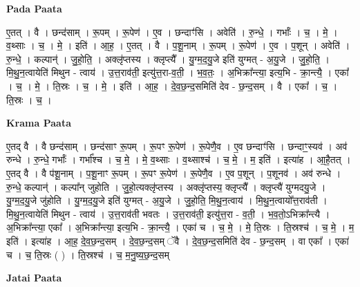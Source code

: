 \documentclass[17pt]{extarticle}
\begin{document}
\textbf{Pada Paata} \newline

ए॒तत् । वै । छन्द॑साम् । रू॒पम् । रू॒पेण॑ । ए॒व । छन्दाꣳ॑सि । अवेति॑ । रु॒न्धे॒ । गर्भाः᳚ । च॒ । मे॒ । व॒थ्साः । च॒ । मे॒ । इति॑ । आ॒ह॒ । ए॒तत् । वै । प॒शू॒नाम् । रू॒पम् । रू॒पेण॑ । ए॒व । प॒शून् । अवेति॑ । रु॒न्धे॒ । कल्पान्॑ । जु॒हो॒ति॒ । अक्लृ॑प्तस्य । क्लृप्त्यै᳚ । यु॒ग्म॒द॒यु॒जे इति॑ युग्मत् - अ॒यु॒जे । जु॒हो॒ति॒ । मि॒थु॒न॒त्वायेति॑ मिथुन - त्वाय॑ । उ॒त्त॒राव॑ती॒ इत्यु॑त्त॒रा-व॒ती॒ । भ॒व॒तः॒ । अ॒भिक्रा᳚न्त्या॒ इत्य॒भि - क्रा॒न्त्यै॒ । एका᳚ । च॒ । मे॒ । ति॒स्रः । च॒ । मे॒ । इति॑ । आ॒ह॒ । दे॒व॒छ॒न्द॒समिति॑ देव - छ॒न्द॒सम् । वै । एका᳚ । च॒ । ति॒स्रः । च॒ ।  \newline


\textbf{Krama Paata} \newline

ए॒तद् वै । वै छन्द॑साम् । छन्द॑साꣳ रू॒पम् । रू॒पꣳ रू॒पेण॑ । रू॒पेणै॒व । ए॒व छन्दाꣳ॑सि । छन्दाꣳ॒॒स्यव॑ । अव॑ रुन्धे । रु॒न्धे॒ गर्भाः᳚ । गर्भा᳚श्च । च॒ मे॒ । मे॒ व॒थ्साः । व॒थ्साश्च॑ । च॒ मे॒ । म॒ इति॑ । इत्या॑ह । आ॒है॒तत् । ए॒तद् वै । वै प॑शू॒नाम् । प॒शू॒नाꣳ रू॒पम् । रू॒पꣳ रू॒पेण॑ । रू॒पेणै॒व । ए॒व प॒शून् । प॒शूनव॑ । अव॑ रुन्धे । रु॒न्धे॒ कल्पान्॑ । कल्पा᳚न् जुहोति । जु॒हो॒त्यक्लृ॑प्तस्य । अक्लृ॑प्तस्य॒ क्लृप्त्यै᳚ । क्लृप्त्यै॑ युग्मदयु॒जे । यु॒ग्म॒द॒यु॒जे जु॑होति । यु॒ग्म॒द॒यु॒जे इति॑ युग्मत् - अ॒यु॒जे । जु॒हो॒ति॒ मि॒थु॒न॒त्वाय॑ । मि॒थु॒न॒त्वायो᳚त्त॒राव॑ती । मि॒थु॒न॒त्वायेति॑ मिथुन - त्वाय॑ । उ॒त्त॒राव॑ती भवतः । उ॒त्त॒राव॑ती॒ इत्यु॑त्त॒रा - व॒ती॒ । भ॒व॒तो॒ऽभिक्रा᳚न्त्यै । अ॒भिक्रा᳚न्त्या॒ एका᳚ । अ॒भिक्रा᳚न्त्या॒ इत्य॒भि - क्रा॒न्त्यै॒ । एका॑ च । च॒ मे॒ । मे॒ ति॒स्रः । ति॒स्रश्च॑ । च॒ मे॒ । म॒ इति॑ । इत्या॑ह । आ॒ह॒ दे॒व॒छ॒न्द॒सम् । दे॒व॒छ॒न्द॒सम् ॅवै । दे॒व॒छ॒न्द॒समिति॑ देव - छ॒न्द॒सम् । वा एका᳚ । एका॑ च । च॒ ति॒स्रः ( ) । ति॒स्रश्च॑ । च॒ म॒नु॒ष्य॒छ॒न्द॒सम् \newline

\textbf{Jatai Paata} \newline
\end{document}

